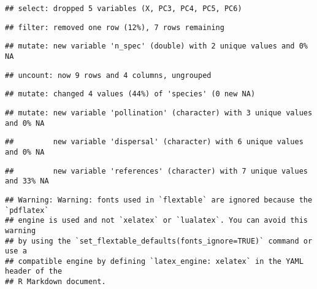 \documentclass[
]{article}
\begin{document}
\begin{verbatim}
## select: dropped 5 variables (X, PC3, PC4, PC5, PC6)
\end{verbatim}

\begin{verbatim}
## filter: removed one row (12%), 7 rows remaining
\end{verbatim}

\begin{verbatim}
## mutate: new variable 'n_spec' (double) with 2 unique values and 0% NA
\end{verbatim}

\begin{verbatim}
## uncount: now 9 rows and 4 columns, ungrouped
\end{verbatim}

\begin{verbatim}
## mutate: changed 4 values (44%) of 'species' (0 new NA)
\end{verbatim}

\begin{verbatim}
## mutate: new variable 'pollination' (character) with 3 unique values and 0% NA
\end{verbatim}

\begin{verbatim}
##         new variable 'dispersal' (character) with 6 unique values and 0% NA
\end{verbatim}

\begin{verbatim}
##         new variable 'references' (character) with 7 unique values and 33% NA
\end{verbatim}

\begin{verbatim}
## Warning: Warning: fonts used in `flextable` are ignored because the `pdflatex`
## engine is used and not `xelatex` or `lualatex`. You can avoid this warning
## by using the `set_flextable_defaults(fonts_ignore=TRUE)` command or use a
## compatible engine by defining `latex_engine: xelatex` in the YAML header of the
## R Markdown document.
\end{verbatim}

\providecommand{\docline}[3]{\noalign{\global\setlength{\arrayrulewidth}{#1}}\arrayrulecolor[HTML]{#2}\cline{#3}}

\setlength{\tabcolsep}{8pt}

\renewcommand*{\arraystretch}{1.5}
\end{document}

